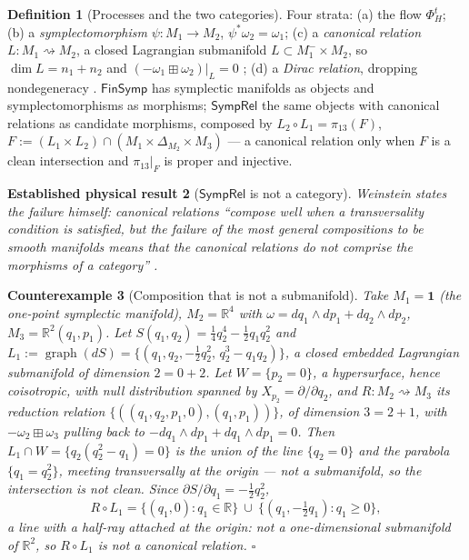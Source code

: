 \documentclass[12pt,a4paper]{article}
\theoremstyle{definition}
\newtheorem{definition}{Definition}[section]
\theoremstyle{plain}
\theoremstyle{commentary}
\newtheorem{established}[definition]{Established physical result}
\newtheorem{counterexample}[definition]{Counterexample}
\newcommand{\R}{\mathbb{R}}
\newcommand{\FinSymp}{\mathsf{FinSymp}}
\newcommand{\SympRel}{\mathsf{SympRel}}
\newcommand{\pt}{\mathbf{1}}
\newcommand{\graph}{\operatorname{graph}}
\begin{document}
\begin{definition}[Processes and the two categories]\label{def:process}
Four strata: (a) the flow $\Phi^{t}_{H}$; (b) a \emph{symplectomorphism} $\psi:M_1\to M_2$,
$\psi^{*}\omega_2=\omega_1$; (c) a \emph{canonical relation} $L:M_1\rightsquigarrow M_2$, a
closed Lagrangian submanifold $L\subset M_1^{-}\times M_2$, so $\dim L=n_1+n_2$ and
$(-\omega_1\boxplus\omega_2)|_L=0$ \cite{Weinstein1982}; (d) a \emph{Dirac relation},
dropping nondegeneracy \cite{Courant1990}. $\FinSymp$ has symplectic manifolds as objects and
symplectomorphisms as morphisms; $\SympRel$ the same objects with canonical relations as
candidate morphisms, composed by $L_2\circ L_1=\pi_{13}(F)$,
$F:=(L_1\times L_2)\cap(M_1\times\Delta_{M_2}\times M_3)$ --- a canonical relation only when
$F$ is a clean intersection and $\pi_{13}|_F$ is proper and injective.
\end{definition}

\begin{established}[$\SympRel$ is not a category]\label{estab:notcat}
Weinstein states the failure himself: canonical relations ``compose well when a transversality
condition is satisfied, but the failure of the most general compositions to be smooth
manifolds means that the canonical relations do not comprise the morphisms of a category''
\cite{Weinstein2009}.
\end{established}

\begin{counterexample}[Composition that is not a submanifold]\label{cex:compose}
Take $M_1=\pt$ (the one-point symplectic manifold), $M_2=\R^{4}$ with
$\omega=dq_1\wedge dp_1+dq_2\wedge dp_2$, $M_3=\R^{2}(q_1,p_1)$. Let
$S(q_1,q_2)=\tfrac{1}{4}q_2^{4}-\tfrac{1}{2}q_1q_2^{2}$ and
$L_1:=\graph(dS)=\{(q_1,q_2,-\tfrac{1}{2}q_2^{2},\,q_2^{3}-q_1q_2)\}$, a closed embedded
Lagrangian submanifold of dimension $2=0+2$. Let $W=\{p_2=0\}$, a hypersurface, hence
coisotropic, with null distribution spanned by $X_{p_2}=\partial/\partial q_2$, and
$R:M_2\rightsquigarrow M_3$ its reduction relation $\{((q_1,q_2,p_1,0),(q_1,p_1))\}$, of
dimension $3=2+1$, with $-\omega_2\boxplus\omega_3$ pulling back to
$-dq_1\wedge dp_1+dq_1\wedge dp_1=0$. Then $L_1\cap W=\{q_2(q_2^{2}-q_1)=0\}$ is the union of
the line $\{q_2=0\}$ and the parabola $\{q_1=q_2^{2}\}$, meeting transversally at the origin
--- \emph{not} a submanifold, so the intersection is not clean. Since
$\partial S/\partial q_1=-\tfrac{1}{2}q_2^{2}$,
\[
 R\circ L_1 = \{(q_1,0):q_1\in\R\}\ \cup\ \{(q_1,-\tfrac{1}{2}q_1): q_1\ge 0\},
\]
a line with a half-ray attached at the origin: not a one-dimensional submanifold of $\R^{2}$,
so $R\circ L_1$ is not a canonical relation. \hfill$\square$
\end{counterexample}
\end{document}
